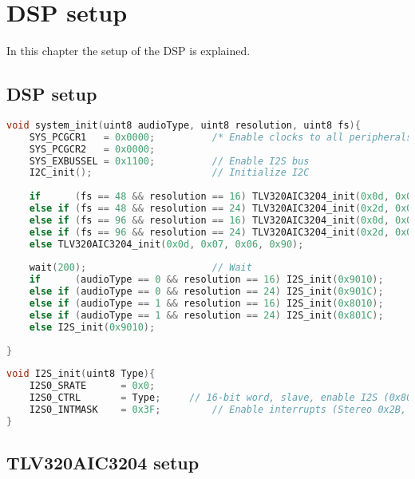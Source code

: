 \chapter{DSP setup}

In this chapter the setup of the DSP is explained.


\section{DSP setup}


\begin{lstlisting}[language=C, caption = {System initialization},label={listingSystemInit}]
void system_init(uint8 audioType, uint8 resolution, uint8 fs){
    SYS_PCGCR1 	 = 0x0000;     		/* Enable clocks to all peripherals */
    SYS_PCGCR2 	 = 0x0000;
	SYS_EXBUSSEL = 0x1100;         	// Enable I2S bus
	I2C_init();        				// Initialize I2C
	
	if 		(fs == 48 && resolution == 16) TLV320AIC3204_init(0x0d, 0x07, 0x06, 0x90);
	else if (fs == 48 && resolution == 24) TLV320AIC3204_init(0x2d, 0x07, 0x06, 0x90);	
	else if (fs == 96 && resolution == 16) TLV320AIC3204_init(0x0d, 0x0E, 0x0D, 0x20);	
	else if	(fs == 96 && resolution == 24) TLV320AIC3204_init(0x2d, 0x0E, 0x0D, 0x20);
	else TLV320AIC3204_init(0x0d, 0x07, 0x06, 0x90);	
	
	wait(200);        				// Wait	
	if 		(audioType == 0 && resolution == 16) I2S_init(0x9010);
	else if (audioType == 0 && resolution == 24) I2S_init(0x901C);	
	else if (audioType == 1 && resolution == 16) I2S_init(0x8010);	
	else if	(audioType == 1 && resolution == 24) I2S_init(0x801C);
	else I2S_init(0x9010);
	
}

\end{lstlisting}

\begin{lstlisting}[language=C, caption = {Setup of I2S port for the DSP},label={listingI2SDSP}]
void I2S_init(uint8 Type){
	I2S0_SRATE 		= 0x0;
    I2S0_CTRL 		= Type;    	// 16-bit word, slave, enable I2S (0x8010), stereo. 24-bit word, slave, enable I2S, mono (0x901C). 
    I2S0_INTMASK 	= 0x3F;    		// Enable interrupts (Stereo 0x2B, Mono 0x17)
}
\end{lstlisting}


\section{TLV320AIC3204 setup}



